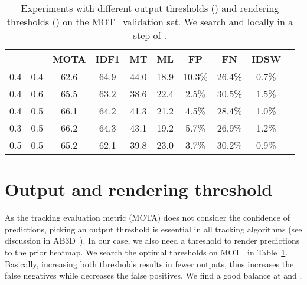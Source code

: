 \documentclass[runningheads]{llncs}
\newcommand{\lbltab}[1]{\label{tbl:#1}}
\newcommand{\reftab}[1]{Table~\ref{tbl:#1}}
\begin{document}
\begin{table}[t]
\center 
\begin{tabular}{@{}c@{\ \ \ \ }c@{\ }c@{\ } c@{\ } c@{\ } c@{\ } c@{\ } c@{\ } c@{\ } c@{}}
\toprule
 &  & MOTA  & IDF1  & MT  & ML  & FP  & FN  & IDSW  \\
\midrule
0.4 & 0.4 & 62.6 & 64.9 & 44.0 & 18.9 & 10.3\% & 26.4\% & 0.7\% \\
0.4 & 0.6 & 65.5 & 63.2 & 38.6 & 22.4 & 2.5\% & 30.5\% & 1.5\% \\
0.4 & 0.5 & 66.1 & 64.2 & 41.3 & 21.2 & 4.5\% & 28.4\% & 1.0\% \\
0.3 & 0.5 & 66.2 & 64.3 & 43.1 & 19.2 & 5.7\% & 26.9\% & 1.2\% \\
0.5 & 0.5 & 65.2 & 62.1 & 39.8 & 23.0 & 3.7\% & 30.2\% & 0.9\% \\
\bottomrule
\end{tabular}
\caption{Experiments with different output thresholds () and rendering thresholds () on the MOT~\cite{MOT16} validation set. We search  and  locally in a step of .}
\lbltab{thresholds}
\vspace{-5mm}
\end{table}

\section{Output and rendering threshold}

As the tracking evaluation metric (MOTA) does not consider the confidence of predictions, picking an output threshold is essential in all tracking algorithms (see discussion in AB3D~\cite{Weng2019_3dmot}). In our case, we also need a threshold to render predictions to the prior heatmap. We search the optimal thresholds on MOT~\cite{MOT16} in \reftab{thresholds}. Basically, increasing both thresholds results in fewer outputs, thus increases the false negatives while decreases the false positives. We find a good balance at  and . 
\end{document}
